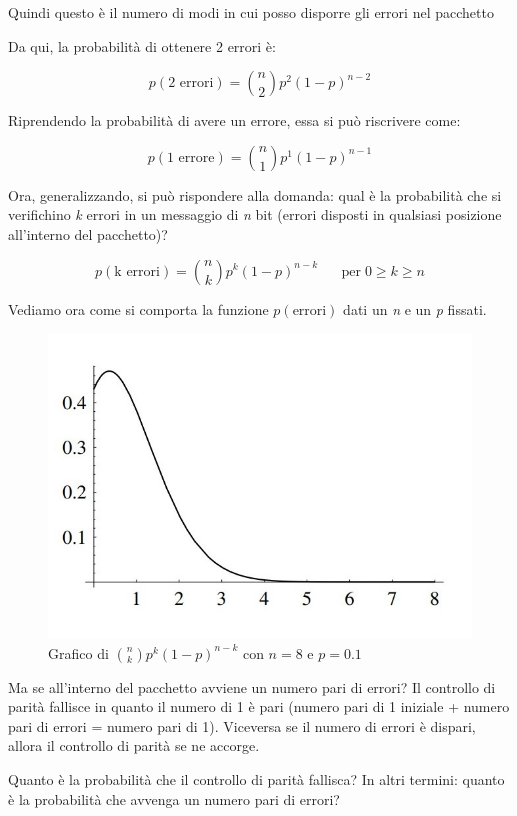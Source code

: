 Quindi questo è il numero di modi in cui posso disporre gli errori nel pacchetto

Da qui, la probabilità di ottenere 2 errori è:

\begin{equation}
p(\text{2 errori}) = \binom{n}{2} p^2 (1-p)^{n-2}
\end{equation}

Riprendendo la probabilità di avere un errore, essa si può riscrivere come:

\begin{equation}
p(\text{1 errore}) = \binom{n}{1} p^1 (1-p)^{n-1}
\end{equation}

Ora, generalizzando, si può rispondere alla domanda: qual è la probabilità che si verifichino \textit{k} errori in un messaggio di \textit{n} bit (errori disposti in qualsiasi posizione all'interno del pacchetto)?

\begin{equation}
p(\text{k errori}) = \binom{n}{k} p^k (1-p)^{n-k} \; \; \; \; \; \; \text{per} \; 0 \geq k \geq n
\end{equation}

Vediamo ora come si comporta la funzione $p(\text{errori})$ dati un \textit{n} e un \textit{p} fissati.
\begin{figure}[h]
	\centering
	\includegraphics[width=0.6\linewidth]{immagini/img4}
	\caption{Grafico di $\binom{n}{k}p^k (1-p)^{n-k}$ con $n=8$ e $p=0.1$}
\end{figure}

Ma se all'interno del pacchetto avviene un numero pari di errori? Il controllo di parità fallisce in quanto il numero di 1 è pari (numero pari di 1 iniziale + numero pari di errori = numero pari di 1).
Viceversa se il numero di errori è dispari, allora il controllo di parità se ne accorge.

Quanto è la probabilità che il controllo di parità fallisca? In altri termini: quanto è la probabilità che avvenga un numero pari di errori?

